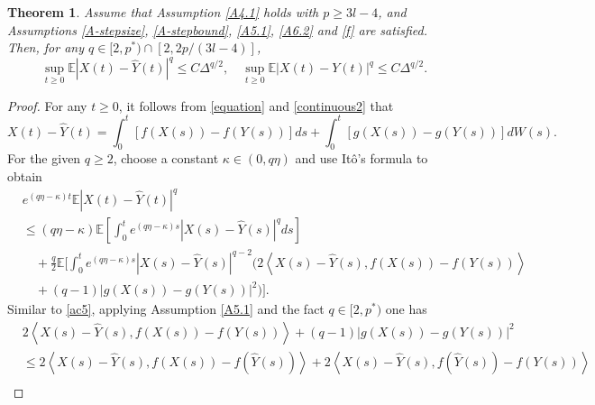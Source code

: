 \documentclass[preprint,12pt,compress]{elsarticle}
\newtheorem{theorem}{Theorem}[section] %
\begin{document}
\begin{theorem}  \label{th-a3}
Assume that Assumption \ref{A4.1} holds with $p \ge 3l-4$, and Assumptions \ref{A-stepsize}, \ref{A-stepbound}, \ref{A5.1}, \ref{A6.2} and \eqref{f} are satisfied.
Then, for any $q \in [2,p^ * ) \cap  \left[ {2,{{2p}}/{(3l - 4)}} \right]$,
\begin{equation*}
	\mathop {\sup }\limits_{t \ge 0} \mathbb{E}{\left| {X(t) - \hat Y(t)} \right|^q} \le {C}\Delta^{{q}/{2}}, \quad  \mathop {\sup }\limits_{t \ge 0} \mathbb{E}{\left| {X(t) - Y(t)} \right|^q} \le {C}\Delta^{{q}/{2}}.
\end{equation*}
\end{theorem}

\begin{proof}
For any $t \ge 0$, it follows from \eqref{equation} and \eqref{continuous2} that
\begin{equation*}
	X(t) -  \hat Y(t) = \int_0^t {\left[ {f(X(s)) - f(Y(s))} \right]ds}  + \int_0^t {\left[ {g(X(s)) - g(Y(s))} \right]dW(s)} .
\end{equation*}
For the given $ q\ge 2$, choose a constant $\kappa \in (0, q \eta)$ and use It\^o's formula to obtain
\begin{equation}  \label{con-rate2-1}
\begin{split}  
	&{e^{\left( {q\eta  - \kappa } \right)t}}\mathbb{E}{\left| {X(t) - \hat Y(t)} \right|^q} \\
	&\le \left( {q\eta  - \kappa } \right)\mathbb{E}\left[ {\int_0^t {{e^{\left( {q\eta  - \kappa } \right)s}}{{\left| {X(s) - \hat Y(s)} \right|}^q}ds} } \right] \\
	&\quad+ \frac{q}{2}\mathbb{E}\Big[ {\int_0^t {{e^{\left( {q\eta  - \kappa } \right)s}}{{\left| {X(s) - \hat Y(s)} \right|}^{q - 2}}\Big( {2\left\langle {X(s) - \hat Y(s),f(X(s)) - f(Y(s))} \right\rangle } } }   \\
	& \quad  + (q - 1){{\left| {g(X(s)) - g(Y(s))} \right|}^2} \Big) \Big].\end{split}
\end{equation}
Similar to \eqref{ac5}, applying Assumption \ref{A5.1} and the fact $q \in [2, p^*)$ one has
\begin{equation*}
\begin{split}
	&2\left\langle {X(s) -  \hat Y(s),f(X(s)) - f(Y(s))} \right\rangle  + (q - 1){\left| {g(X(s)) - g(Y(s))} \right|^2} \\
	&\le  2\left\langle {X(s) - \hat Y(s),f(X(s)) - f(\hat Y(s))} \right\rangle  + 2\left\langle {X(s) - \hat Y(s),f(\hat Y(s)) - f(Y(s))} \right\rangle  \\

\end{split}
\end{equation*}
\end{proof}
\end{document}
